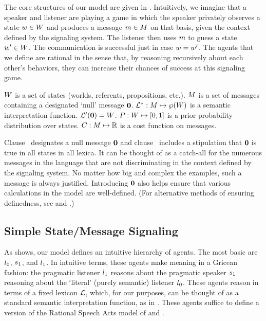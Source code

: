 \documentclass[12pt,twoside]{article}
\renewcommand{\_}{\textbf{\textunderscore\hspace{-4pt}\textunderscore\hspace{-3pt}\textunderscore\hspace{-4pt}\textunderscore}\hspace{0.5pt}}			%
\begin{document}
The core structures of our model are given in .
Intuitively, we imagine that a speaker and listener are playing a game
in which the speaker privately observes a state $w \in W$
and produces a message $m \in M$ on that basis, given the
context defined by the signaling system. The listener then uses $m$
to guess a state $w' \in W$. The communication is
successful just in case $w = w'$. The agents that we define
are rational in the sense that, by reasoning recursively about each
other's behaviors, they can increase their chances of success at this
signaling game.
%
\begin{exe}
\ex\label{model}
  \begin{xlist}
  \ex\label{states}%
    $W$ is a set of states (worlds, referents, propositions, etc.).
  \ex\label{messages}%
    $M$ is a set of messages containing a designated `null' message $\mathbf{0}$.
  \ex\label{lex}%
    $\mathcal{L}^{\ast}: M \mapsto \wp(W)$ is a semantic interpretation function. 
    $\mathcal{L}'(\mathbf{0}) = W$.
  \ex\label{prior}%
    $P : W \mapsto [0,1]$ is a prior probability
    distribution over states.    
  \ex\label{costs}%
    $C : M \mapsto \mathbb{R}$ is a cost function on messages.
  \end{xlist}
\end{exe}

Clause~ designates a null message $\mathbf{0}$
and clause~ includes a stipulation that $\mathbf{0}$
is true in all states in all lexica. It can be thought of as a
catch-all for the numerous messages in the language that are not
discriminating in the context defined by the signaling system.  No
matter how big and complex the examples, such a message is always
justified. Introducing $\mathbf{0}$ also helps ensure that various
calculations in the model are well-defined. (For alternative methods
of ensuring definedness, see \citealt{Jaeger:2011} and
\citealt{bergen-levy-goodman:2014}.)


\subsection{Simple State/Message Signaling}\label{sec:rsa}

As  shows, our model defines an intuitive
hierarchy of agents. The most basic are $l_{0}$,
$s_{1}$, and $l_{1}$. In intuitive terms, these agents
make meaning in a Gricean fashion: the pragmatic listener
$l_{1}$ reasons about the pragmatic speaker $s_{1}$
reasoning about the `literal' (purely semantic) listener
$l_{0}$. These agents reason in terms of a fixed lexicon
$\mathcal{L}$, which, for our purposes, can be thought of as a standard
semantic interpretation function, as in . These
agents suffice to define a version of the Rational Speech Acts model
of \citet{Frank:Goodman:2012} and \citet{Goodman:Stuhlmuller:2013}.
\end{document}
